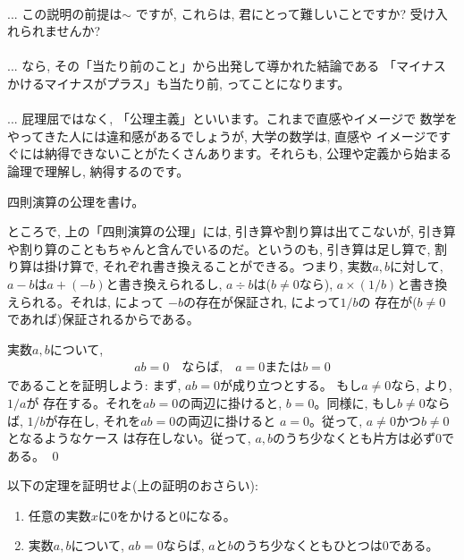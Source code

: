 \begin{faq}{\small{}\\
... この説明の前提は$\sim$
ですが, これらは, 君にとって難しいことですか? 受け入れられませんか?\\
\\
... なら, その「当たり前のこと」から出発して導かれた結論である
「マイナスかけるマイナスがプラス」も当たり前, ってことになります。\\
\\
... 屁理屈ではなく, 「公理主義」といいます。これまで直感やイメージで
数学をやってきた人には違和感があるでしょうが, 大学の数学は, 直感や
イメージですぐには納得できないことがたくさんあります。それらも, 
公理や定義から始まる論理で理解し, 納得するのです。}\end{faq}


\begin{q}\label{q:axiom_shisokuenzan} 四則演算の公理を書け。\end{q}

ところで, 上の「四則演算の公理」には, 引き算や割り算は出てこないが, 
引き算や割り算のこともちゃんと含んでいるのだ。というのも, 引き算は足し算で, 
割り算は掛け算で, それぞれ書き換えることができる。つまり, 実数$a, b$に対して, 
$a-b$は$a+(-b)$と書き換えられるし, $a\div b$は($b\neq0$なら), 
$a\times(1/b)$と書き換えられる。それは, によって
$-b$の存在が保証され, によって$1/b$の
存在が($b\neq0$であれば)保証されるからである。\mv

\begin{exmpl} 実数$a, b$について, 
\begin{eqnarray}
ab=0\quad\text{ならば,}\quad a=0\text{または}b=0\label{eq:ab_0_a_0_b_0}
\end{eqnarray}
であることを証明しよう: まず, $ab=0$が成り立つとする。
もし$a\neq0$なら, より, $1/a$が
存在する。それを$ab=0$の両辺に掛けると, $b=0$。同様に, 
もし$b\neq0$ならば, $1/b$が存在し, それを$ab=0$の両辺に掛けると
$a=0$。従って, $a\neq0$かつ$b\neq0$となるようなケース
は存在しない。従って, $a, b$のうち少なくとも片方は必ず0である。
\qed\end{exmpl}

\begin{q}\label{q:th_zero} 以下の定理を証明せよ(上の証明のおさらい):
\begin{enumerate}
\item 任意の実数$x$に0をかけると0になる。
\item 実数$a, b$について, $ab=0$ならば, $a$と$b$のうち少なくともひとつは0である。
\end{enumerate}
\end{q}

